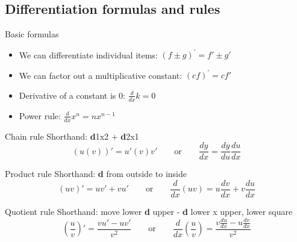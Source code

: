 \documentclass{article}
\begin{document}
\subsection{Differentiation formulas and rules}
\begin{knBox}
    {Basic formulas}
    \begin{itemize}
        \item We can differentiate individual items: $\displaystyle {\left( {f \pm g} \right)^\prime } = f' \pm g'$
        \item We can factor out a multiplicative constant: $\displaystyle {\left( {cf} \right)^\prime } = cf'$
        \item Derivative of a constant is 0: $\frac{d}{dx}k = 0$
        \item Power rule: $\frac{d}{dx}x^n = nx^{n-1}$
    \end{itemize}
\end{knBox}
\begin{minipage}{0.65\textwidth}
    \begin{theorem}
        {Chain rule}
        Shorthand: \textbf{d}1x2 + \textbf{d}2x1
        \[(u(v))'=u'(v)v'\quad\quad\text{or}\quad\quad\frac{dy}{dx}=\frac{dy}{du}\frac{du}{dx}\]
    \end{theorem}
    \begin{theorem}
        {Product rule}
        Shorthand: \textbf{d} from outside to inside
        \[(uv)' = uv' + vu'\quad\quad\text{or}\quad\quad\frac{d}{dx}(uv)=u\frac{dv}{dx}+v\frac{du}{dx}\]
    \end{theorem}
    \begin{theorem}
        {Quotient rule}
        Shorthand: move lower \textbf{d} upper - \textbf{d} lower x upper, lower square
        \[(\frac{u}{v})'=\frac{vu'-uv'}{v^2}\quad\quad\text{or}\quad\quad\frac{d}{dx}(\frac{u}{v})=\frac{v\frac{du}{dx}-u\frac{dv}{dx}}{v^2}\]
    \end{theorem}
\end{minipage}
\hfill
\end{document}

